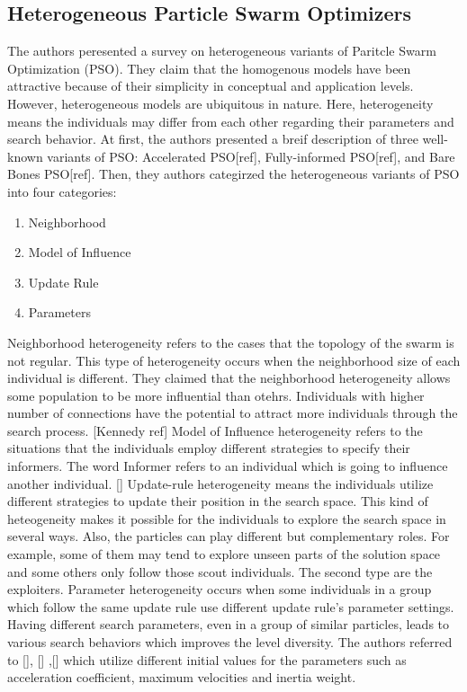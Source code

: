 \subsection{Heterogeneous Particle Swarm Optimizers}
The authors peresented a survey on heterogeneous variants of Paritcle Swarm Optimization (PSO). They claim that the homogenous models have been attractive because of their simplicity in conceptual and application levels. However, heterogeneous models are ubiquitous in nature. Here, heterogeneity means the individuals may differ from each other regarding their parameters and search behavior. \newline 
At first, the authors presented a breif description of three well-known variants of PSO: Accelerated PSO[ref], Fully-informed PSO[ref], and Bare Bones PSO[ref]. Then, they authors categirzed the heterogeneous variants of PSO into four categories:
\begin{enumerate}
	\item Neighborhood
	\item Model of Influence
	\item Update Rule
	\item Parameters
\end{enumerate}
Neighborhood heterogeneity refers to the cases that the topology of the swarm is not regular. This type of heterogeneity occurs when the neighborhood size of each individual is different. They claimed that the neighborhood heterogeneity allows some population to be more influential than otehrs. Individuals with higher number of connections have the potential to attract more individuals through the search process. [Kennedy ref]\newline
Model of Influence heterogeneity refers to the situations that the individuals employ different strategies to specify their informers. The word Informer refers to an individual which is going to influence another individual. []\newline
Update-rule heterogeneity means the individuals utilize different strategies to update their position in the search space. This kind of heteogeneity makes it possible for the individuals to explore the search space in several ways. Also, the particles can play different but complementary roles. For example, some of them may tend to explore unseen parts of the solution space and some others only follow those scout individuals. The second type are the exploiters.\newline
Parameter heterogeneity occurs when some individuals in a group which follow the same update rule use different update rule's parameter settings. Having different search parameters, even in a group of similar particles, leads to various search behaviors which improves the level diversity. The authors referred to [], [] ,[] which utilize different initial values for the parameters such as acceleration coefficient, maximum velocities and inertia weight.\newline
